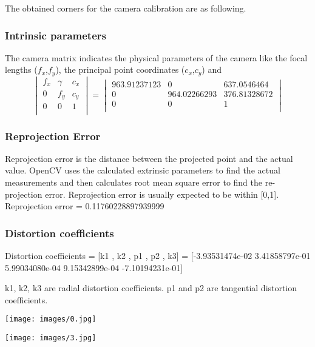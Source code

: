 The obtained corners for the camera calibration are as following. 

\subsubsection{Intrinsic parameters}
The camera matrix indicates the physical parameters of the camera like the focal lengths ($f_x$,$f_y$), the principal point coordinates ($c_x$,$c_y$) and 
$$
\begin{vmatrix}
f_x & \gamma & c_x\\
0 & f_y & c_y\\
0 & 0 & 1    \\
\end{vmatrix}
= 
\begin{vmatrix}
963.91237123 & 0 & 637.0546464\\
0 & 964.02266293 & 376.81328672\\
0 & 0 & 1    \\
\end{vmatrix}
$$

\subsubsection{Reprojection Error}
Reprojection error is the distance between the projected point and the actual value. OpenCV uses the calculated extrinsic parameters to find the actual measurements and then calculates root mean square error to find the re-projection error. Reprojection error is usually expected to be within [0,1].
\bigbreak
Reprojection error = 0.11760228897939999

\subsubsection{Distortion coefficients}

Distortion coefficients = [k1 , k2 , p1 , p2 , k3] 
= [-3.93531474e-02  3.41858797e-01  5.99034080e-04  9.15342899e-04 -7.10194231e-01]

\bigbreak
k1, k2, k3 are radial distortion coefficients. p1 and p2 are tangential distortion coefficients.

\bigbreak
\begin{minipage}{0.5\textwidth}
	\texttt{[image: images/0.jpg]}
	\centering
	\label{fig:picture}
\end{minipage}

\begin{minipage}{0.5\textwidth}
	\texttt{[image: images/3.jpg]}
	\centering
	\label{fig:picture}
\end{minipage}


